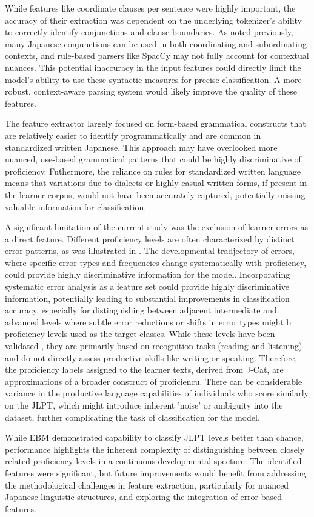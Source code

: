 While features like coordinate clauses per sentence were highly important, the accuracy of their extraction was
dependent on the underlying tokenizer's ability to correctly identify conjunctions and clause boundaries. As noted
previously, many Japanese conjunctions can be used in both coordinating and subordinating contexts, and rule-based
parsers like SpacCy may not fully account for contextual nuances. This potential inaccuracy in the input features
could directly limit the model's ability to use these syntactic measures for precise classification. A more robust,
context-aware parsing system would likely improve the quality of these features.

The feature extractor largely focused on form-based grammatical constructs that are relatively easier to identify
programmatically and are common in standardized written Japanese. This approach may have overlooked more nuanced,
use-based grammatical patterns that could be highly discriminative of proficiency. Futhermore, the reliance on rules
for standardized written language means that variations due to dialects or highly casual written forms, if present
in the learner corpus, would not have been accurately captured, potentially missing valuable information for
classification.

A significant limitation of the current study was the exclusion of learner errors as a direct feature. Different
proficiency levels are often
characterized by distinct error patterns, as was illustrated in \citet{Hawkins_Buttery_2010}.  The
developmental tradjectory of errors, where specific error types and frequencies change systematically with
proficiency, could provide highly discriminative information for the model.
Incorporating
systematic error analysis as a
feature
set
could provide
highly discriminative information, potentially leading to substantial improvements in classification accuracy,
especially for distinguishing between adjacent intermediate and advanced levels where subtle error reductions or
shifts in error types might b proficiency levels used as the target classes. While these levels have been validated \citet{jcat_interpretation_guide}, they are primarily based on recognition tasks (reading and listening) and do not directly assess productive skills like writing or speaking. Therefore, the proficiency labels assigned to the learner texts, derived from J-Cat, are approximations of a broader construct of proficiencu. There can be considerable variance in the productive language capabilities of individuals who score similarly on the JLPT, which might introduce inherent 'noise' or ambiguity into the dataset, further complicating the task of classification for the model.

While EBM demonstrated capability to classify JLPT levels better than chance, performance highlights the inherent
complexity of distinguishing between closely related proficiency levels in a continuous developmental specture. The
identified features were significant, but future improvements would benefit from addressing the methodological
challenges in feature extraction, particularly for nuanced Japanese linguistic structures, and exploring the
integration of error-based features.